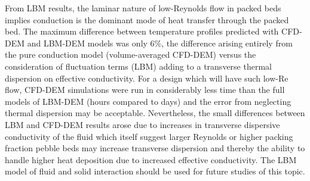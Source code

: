{From LBM results, the laminar nature of low-Reynolds flow in packed beds implies conduction is the dominant mode of heat transfer through the packed bed. The maximum difference between temperature profiles predicted with CFD-DEM and LBM-DEM models was only 6\%, the difference arising entirely from the pure conduction model (volume-averaged CFD-DEM) versus the consideration of fluctuation terms (LBM) adding to a transverse thermal dispersion on effective conductivity. For a design which will have such low-Re flow, CFD-DEM simulations were run in considerably less time than the full models of LBM-DEM (hours compared to days) and the error from neglecting thermal dispersion may be acceptable. Nevertheless, the small differences between LBM and CFD-DEM results arose due to increases in transverse dispersive conductivity of the fluid which itself suggest larger Reynolds or higher packing fraction pebble beds may increase transverse dispersion and thereby the ability to handle higher heat deposition due to increased effective conductivity. The LBM model of fluid and solid interaction should be used for future studies of this topic.

}